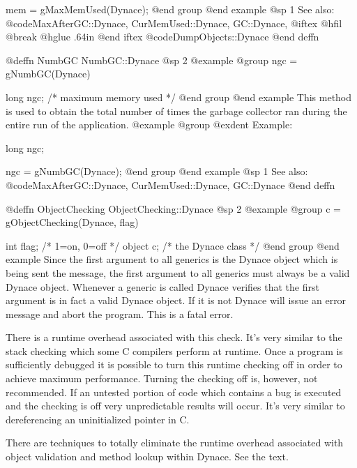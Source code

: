 mem = gMaxMemUsed(Dynace);
@end group
@end example
@sp 1
See also:  @code{MaxAfterGC::Dynace, CurMemUsed::Dynace, GC::Dynace,}
@iftex
@hfil @break @hglue .64in    
@end iftex
@code{DumpObjects::Dynace}
@end deffn









@deffn {NumbGC} NumbGC::Dynace
@sp 2
@example
@group
ngc = gNumbGC(Dynace)

long    ngc;    /*  maximum memory used  */
@end group
@end example
This method is used to obtain the total number of times the garbage
collector ran during the entire run of the application.
@example
@group
@exdent Example:

long    ngc;

ngc = gNumbGC(Dynace);
@end group
@end example
@sp 1
See also:  @code{MaxAfterGC::Dynace, CurMemUsed::Dynace, GC::Dynace}
@end deffn










@deffn {ObjectChecking} ObjectChecking::Dynace
@sp 2
@example
@group
c = gObjectChecking(Dynace, flag)

int     flag;   /*  1=on,  0=off   */
object  c;      /*  the Dynace class  */
@end group
@end example
Since the first argument to all generics is the Dynace object which is
being sent the message, the first argument to all generics must always
be a valid Dynace object.  Whenever a generic is called Dynace verifies that
the first argument is in fact a valid Dynace object.  If it is not Dynace
will issue an error message and abort the program.  This is a fatal
error.

There is a runtime overhead associated with this check.  It's very
similar to the stack checking which some C compilers perform at
runtime.  Once a program is sufficiently debugged it is possible
to turn this runtime checking off in order to achieve maximum
performance.  Turning the checking off is, however, not recommended.
If an untested portion of code which contains a bug is executed
and the checking is off very unpredictable results will occur.
It's very similar to dereferencing an uninitialized pointer in C.

There are techniques to totally eliminate the runtime overhead
associated with object validation and method lookup within Dynace.
See the text.

